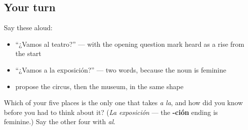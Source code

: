 \subsection*{Your turn}
Say these aloud:

\begin{itemize}
\raggedright
  \item \textquotedblleft{}¿Vamos al teatro?\textquotedblright{} — with the opening question mark heard as a rise from the start
  \item \textquotedblleft{}¿Vamos a la exposición?\textquotedblright{} — two words, because the noun is feminine
  \item propose the circus, then the museum, in the same shape
\end{itemize}

\begin{tcolorbox}[breakable,colback=teal!4,colframe=teal!35!black,title={Before you move on}]
Which of your five places is the only one that takes \emph{a la}, and how did you know before you had to think about it? (\emph{La exposición} — the \textbf{-ción} ending is feminine.) Say the other four with \emph{al}.
\end{tcolorbox}

